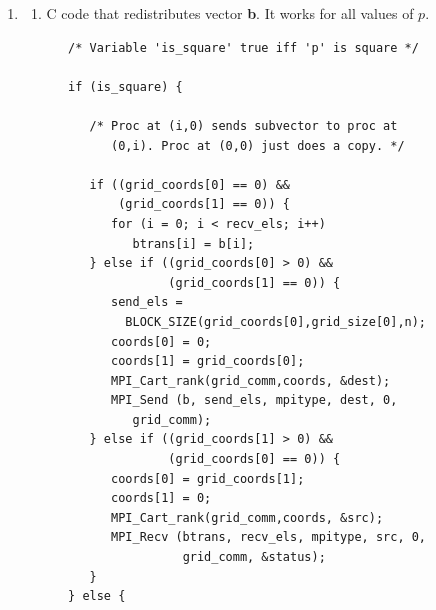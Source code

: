 \begin{enumerate}
\begin{verbatim}
double   *b;              /* Where to store vector */
MPI_Comm  col_comm;       /* Communicator shared by
                             processes in same column */
MPI_Comm  grid_comm;      /* Logical grid of procs */
int       grid_coords[2]; /* Coords of process */
int       grid_id;        /* Rank in grid comm */
int       grid_size[2];   /* Number of procs per dim */
int       p;              /* Number of processes */
int       periodic[2];    /* Wraparound flag */
int       nprime;         /* Size of vector */

MPI_Init (&argc, &argv);
MPI_Comm_size (MPI_COMM_WORLD, &p);
grid_size[0] = grid_size[1] = 0;
MPI_Dims_create (p, 2, grid_size);
periodic[0] = periodic[1] = 0;
MPI_Cart_create (MPI_COMM_WORLD, 2, grid_size, periodic,
                 1, &grid_comm);
MPI_Comm_rank (grid_comm, &grid_id);
MPI_Cart_coords (grid_comm, grid_id, 2, grid_coords);
MPI_Comm_split (grid_comm, grid_coords[1],
                grid_coords[0], &col_comm);
if (grid_coords[1] == 0)
   nprime = read_block_vector ("Vector", (void *) &b,
                               MPI_DOUBLE, col_comm);
...
}
\end{verbatim}

\item

\begin{enumerate}
\addtocounter{enumii}{2}

\item C code that redistributes vector {\bf b}. It works for
      all values of $p$.

\begin{verbatim}
   /* Variable 'is_square' true iff 'p' is square */

   if (is_square) {

      /* Proc at (i,0) sends subvector to proc at
         (0,i). Proc at (0,0) just does a copy. */

      if ((grid_coords[0] == 0) &&
          (grid_coords[1] == 0)) {
         for (i = 0; i < recv_els; i++)
            btrans[i] = b[i];
      } else if ((grid_coords[0] > 0) &&
                 (grid_coords[1] == 0)) {
         send_els =
           BLOCK_SIZE(grid_coords[0],grid_size[0],n);
         coords[0] = 0;
         coords[1] = grid_coords[0];
         MPI_Cart_rank(grid_comm,coords, &dest);
         MPI_Send (b, send_els, mpitype, dest, 0,
            grid_comm);
      } else if ((grid_coords[1] > 0) &&
                 (grid_coords[0] == 0)) {
         coords[0] = grid_coords[1];
         coords[1] = 0;
         MPI_Cart_rank(grid_comm,coords, &src);
         MPI_Recv (btrans, recv_els, mpitype, src, 0,
                   grid_comm, &status);
      }
   } else {


\end{verbatim}
\end{enumerate}
\end{enumerate}
